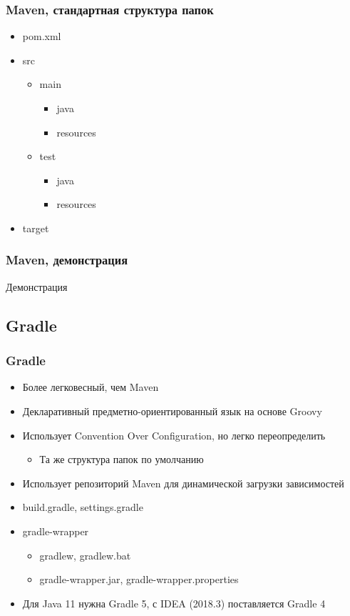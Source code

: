 \documentclass[xetex,mathserif,serif]{beamer}
\begin{document}
	\begin{frame}
		\frametitle{Maven, стандартная структура папок}
		\begin{itemize}
			\item pom.xml
			\item src
			\begin{itemize}
				\item main
				\begin{itemize}
					\item java
					\item resources
				\end{itemize}
				\item test
				\begin{itemize}
					\item java
					\item resources
				\end{itemize}
			\end{itemize}
			\item target
		\end{itemize}
	\end{frame}

	\begin{frame}
		\frametitle{Maven, демонстрация}
		\begin{center}
			\huge{Демонстрация}
		\end{center}
	\end{frame}

	\subsection{Gradle}

	\begin{frame}
		\frametitle{Gradle}
		\begin{itemize}
			\item Более легковесный, чем Maven
			\item Декларативный предметно-ориентированный язык на основе Groovy
			\item Использует Convention Over Configuration, но легко переопределить
			\begin{itemize}
				\item Та же структура папок по умолчанию
			\end{itemize}
			\item Использует репозиторий Maven для динамической загрузки зависимостей
			\item build.gradle, settings.gradle
			\item gradle-wrapper
			\begin{itemize}
				\item gradlew, gradlew.bat
				\item gradle-wrapper.jar, gradle-wrapper.properties
			\end{itemize}
			\item Для Java 11 нужна Gradle 5, с IDEA (2018.3) поставляется Gradle 4
		\end{itemize}
	\end{frame}
\end{document}
